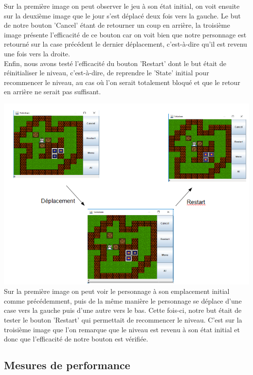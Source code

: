 \documentclass[a4paper,12pt]{article} %
\begin{document}
Sur la première image on peut observer le jeu à son état initial, on voit ensuite sur la deuxième image que le jour s'est déplacé deux fois vers la gauche. Le but de notre bouton 'Cancel' étant de retourner un coup en arrière, la troisième image présente l'efficacité de ce bouton car on voit bien que notre personnage est retourné sur la case précédent le dernier déplacement, c'est-à-dire qu'il est revenu une fois vers la droite.\\

Enfin, nous avons testé l'efficacité du bouton 'Restart' dont le but était de réinitialiser le niveau, c'est-à-dire, de reprendre le 'State' initial pour recommencer le niveau, au cas où l'on serait totalement bloqué et que le retour en arrière ne serait pas suffisant.

\includegraphics[scale=0.9]{Test4.PNG}\\

Sur la première image on peut voir le personnage à son emplacement initial comme précédemment, puis de la même manière le personnage se déplace d'une case vers la gauche puis d'une autre vers le bas. Cette fois-ci, notre but était de tester le bouton 'Restart' qui permettait de recommencer le niveau. C'est sur la troisième image que l'on remarque que le niveau est revenu à son état initial et donc que l'efficacité de notre bouton est vérifiée.\\ 

\subsection{Mesures de performance}
\end{document}
